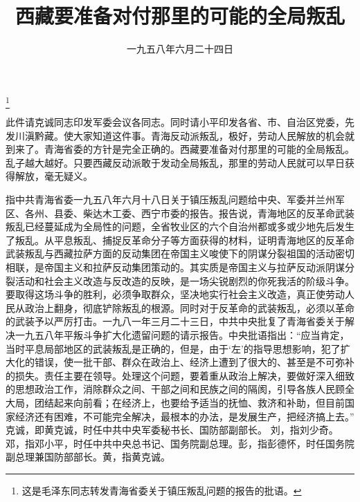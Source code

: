 
\title{西藏要准备对付那里的可能的全局叛乱}
\date{一九五八年六月二十四日}
\thanks{这是毛泽东同志转发青海省委关于镇压叛乱问题的报告的批语。}
\maketitle


此件请克诚同志印发军委会议各同志。同时请小平印发各省、市、自治区党委，先发川滇黔藏。使大家知道这件事。青海反动派叛乱，极好，劳动人民解放的机会就到来了。青海省委的方针是完全正确的。西藏要准备对付那里的可能的全局叛乱。乱子越大越好。只要西藏反动派敢于发动全局叛乱，那里的劳动人民就可以早日获得解放，毫无疑义。

\begin{maonote}
指中共青海省委一九五八年六月十八日关于镇压叛乱问题给中央、军委并兰州军区、各州、县委、柴达木工委、西宁市委的报告。报告说，青海地区的反革命武装叛乱已经蔓延成为全局性的问题，全省牧业区的六个自治州都或多或少地先后发生了叛乱。从平息叛乱、捕捉反革命分子等方面获得的材料，证明青海地区的反革命武装叛乱与西藏拉萨方面的反动集团在帝国主义唆使下的阴谋分裂祖国的活动密切相联，是帝国主义和拉萨反动集团策动的。其实质是帝国主义与拉萨反动派阴谋分裂活动和社会主义改造与反改造的反映，是一场尖锐剧烈的你死我活的阶级斗争。要取得这场斗争的胜利，必须争取群众，坚决地实行社会主义改造，真正使劳动人民从政治上翻身，彻底铲除叛乱的根源。同时对于反革命的武装叛乱，必须以革命的武装予以严厉打击。一九八一年三月二十三日，中共中央批复了青海省委关于解决一九五八年平叛斗争扩大化遗留问题的请示报告。中央批语指出：“应当肯定，当时平息局部地区的武装叛乱是正确的，但是，由于‘左’的指导思想影响，犯了扩大化的错误，使一批干部、群众在政治上、经济上遭到了很大的、甚至是不可弥补的损失。责任主要在领导。处理这个问题，要着重从政治上解决，要做好深入细致的思想政治工作，消除群众之间、干部之间和民族之间的隔阂，引导各族人民顾全大局，团结起来向前看；在经济上，也要给予适当的抚恤、救济和补助，但目前国家经济还有困难，不可能完全解决，最根本的办法，是发展生产，把经济搞上去。”
克诚，即黄克诚，时任中共中央军委秘书长、国防部副部长。
刘，指刘少奇。邓，指邓小平，时任中共中央总书记、国务院副总理。彭，指彭德怀，时任国务院副总理兼国防部部长。黄，指黄克诚。
\end{maonote}
